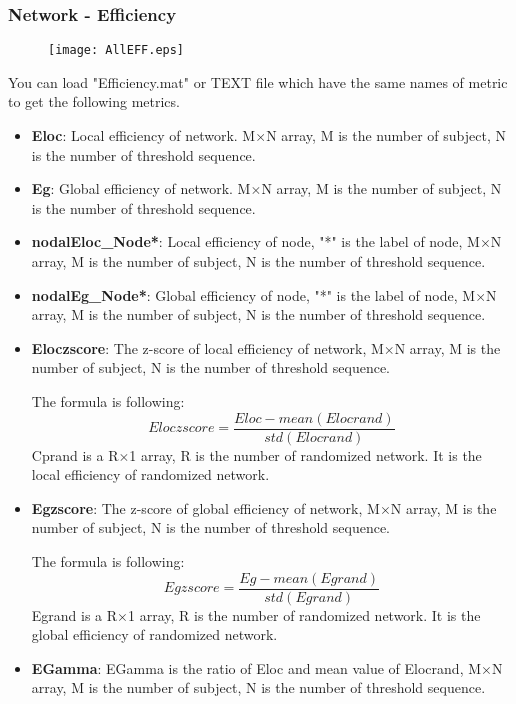 \documentclass[11pt]{article}
\begin{document}
			\subsubsection{Network - Efficiency}
				\begin{figure}
					\begin{center}
						\texttt{[image: AllEFF.eps]}
					\end{center}
				\end{figure}
				You can load "Efficiency.mat" or TEXT file which have the same names of metric to get the following metrics.
				\begin{itemize}
					\item \textbf{Eloc}: Local efficiency of network.
						M$\times$N array, M is the number of subject, N is the number of threshold sequence.
					\item \textbf{Eg}: Global efficiency of network.
						M$\times$N array, M is the number of subject, N is the number of threshold sequence.
					\item \textbf{nodalEloc\_Node*}: Local efficiency of node, "*" is the label of node,
						M$\times$N array, M is the number of subject, N is the number of threshold sequence.
					\item \textbf{nodalEg\_Node*}: Global efficiency of node, "*" is the label of node,
						M$\times$N array, M is the number of subject, N is the number of threshold sequence.
					\item \textbf{Eloczscore}: The z-score of local efficiency of network, 
						M$\times$N array, M is the number of subject, N is the number of threshold sequence.

						The formula is following:
						$$Eloczscore=\frac{Eloc-mean(Elocrand)}{std(Elocrand)}$$
						Cprand is a R$\times$1 array, R is the number of randomized network. 
						It is the local efficiency of randomized network.
					\item \textbf{Egzscore}: The z-score of global efficiency of network,
						M$\times$N array, M is the number of subject, N is the number of threshold sequence.

						The formula is following:
						$$Egzscore=\frac{Eg-mean(Egrand)}{std(Egrand)}$$
						Egrand is a R$\times$1 array, R is the number of randomized network. 
						It is the global efficiency of randomized network.
					\item \textbf{EGamma}: EGamma is the ratio of Eloc and mean value of Elocrand,
						M$\times$N array, M is the number of subject, N is the number of threshold sequence.
						

\end{itemize}
\end{document}
